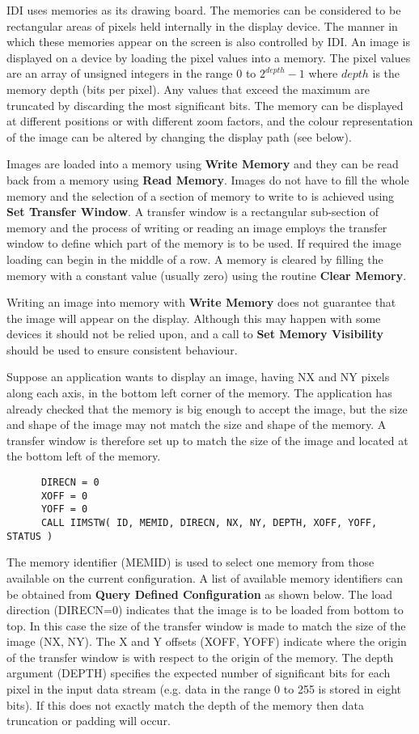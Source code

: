 IDI uses memories as its drawing board. The memories can be considered to
be rectangular areas of pixels held internally in the display device.
The manner in which these memories appear on the screen is also controlled
by IDI.
An image is displayed on a device by loading the pixel values into a memory.
The pixel values are an array of unsigned integers in the range 0 to
$2^{depth}-1$ where $depth$ is the memory depth (bits per pixel). Any
values that exceed the maximum are truncated by discarding the most
significant bits. The memory can be displayed
at different positions or with different zoom factors, and the colour
representation of the image can be altered by changing the display path
(see below).

Images are loaded into a memory using {\bf Write Memory} and they can be
read back from a memory using {\bf Read Memory}. Images do not have to
fill the whole memory and the selection of a section of memory to write
to is achieved using {\bf Set Transfer Window}. A transfer window is a
rectangular sub-section of memory and the process of writing or reading
an image employs the transfer window to define which part of the
memory is to be used. If required the image
loading can begin in the middle of a row. A memory is cleared by
filling the memory with a constant value (usually zero) using the
routine {\bf Clear Memory}.

Writing an image into memory with {\bf Write Memory} does not
guarantee that the image will appear on the display. Although this
may happen with some devices it should not be relied upon, and a
call to {\bf Set Memory Visibility} should be used to ensure
consistent behaviour.

Suppose an application wants to display an image, having NX and NY
pixels along each axis, in the bottom left corner of the memory.
The application has already checked that the memory is big
enough to accept the image, but the size and shape of the image may
not match the size and shape of the memory. A transfer window is
therefore set up to match the size of the image and located at the
bottom left of the memory.
\begin{small}
\begin{verbatim}
      DIRECN = 0
      XOFF = 0
      YOFF = 0
      CALL IIMSTW( ID, MEMID, DIRECN, NX, NY, DEPTH, XOFF, YOFF, STATUS )
\end{verbatim}
\end{small}
The memory identifier (MEMID) is used to select one memory from those
available on the current configuration. A list of available memory
identifiers can be obtained from {\bf Query Defined Configuration}
as shown below. The load direction (DIRECN=0) indicates that the image
is to be loaded from bottom to top. In this case the size of the transfer
window is made to match the size of the image (NX, NY). The X and Y
offsets (XOFF, YOFF) indicate where the origin of the transfer window
is with respect to the origin of the memory. The depth
argument (DEPTH) specifies the expected number of significant bits
for each pixel in the input data stream (e.g. data in the range 0 to
255 is stored in eight bits). If this does not exactly match the
depth of the memory then data truncation or padding will occur.

